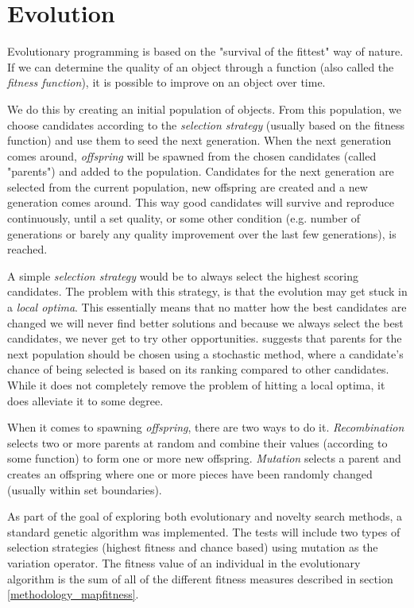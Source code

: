 \section{Evolution}
\label{methodology_evolution}

Evolutionary programming\cite{eiben2008introduction, eiben2002evolutionary} is based on the "survival of the fittest" way of nature. If we can determine the quality of an object through a function (also called the \textit{fitness function}), it is possible to improve on an object over time.

We do this by creating an initial population of objects. From this population, we choose candidates according to the \textit{selection strategy} (usually based on the fitness function) and use them to seed the next generation. When the next generation comes around, \textit{offspring} will be spawned from the chosen candidates (called "parents") and added to the population. Candidates for the next generation are selected from the current population, new offspring are created and a new generation comes around. This way good candidates will survive and reproduce continuously, until a set quality, or some other condition (e.g. number of generations or barely any quality improvement over the last few generations), is reached.

A simple \textit{selection strategy} would be to always select the highest scoring candidates. The problem with this strategy, is that the evolution may get stuck in a \textit{local optima}. This essentially means that no matter how the best candidates are changed we will never find better solutions and because we always select the best candidates, we never get to try other opportunities. \citeauthor{rocha1999preventing}\cite{rocha1999preventing} suggests that parents for the next population should be chosen using a stochastic method, where a candidate's chance of being selected is based on its ranking compared to other candidates. While it does not completely remove the problem of hitting a local optima, it does alleviate it to some degree.

When it comes to spawning \textit{offspring}, there are two ways to do it\cite[Chapter 2]{shaker2015procedural}. \textit{Recombination} selects two or more parents at random and combine their values (according to some function) to form one or more new offspring. \textit{Mutation} selects a parent and creates an offspring where one or more pieces have been randomly changed (usually within set boundaries). 

As part of the goal of exploring both evolutionary and novelty search methods, a standard genetic algorithm was implemented. The tests will include two types of selection strategies (highest fitness and chance based) using mutation as the variation operator. The fitness value of an individual in the evolutionary algorithm is the sum of all of the different fitness measures described in section \ref{methodology_mapfitness}.
